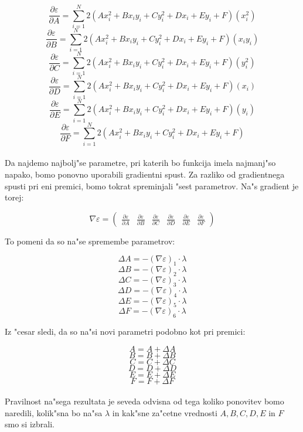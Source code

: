 \documentclass[a4paper, 12pt]{article}
\begin{document}
	$$\frac{\partial \varepsilon}{\partial A} = \sum_{i=1}^{N}2(Ax_i^2 + Bx_iy_i + Cy_i^2 + Dx_i + Ey_i + F)(x_i^2)$$
	$$\frac{\partial \varepsilon}{\partial B} = \sum_{i=1}^{N}2(Ax_i^2 + Bx_iy_i + Cy_i^2 + Dx_i + Ey_i + F)(x_iy_i)$$
	$$\frac{\partial \varepsilon}{\partial C} = \sum_{i=1}^{N}2(Ax_i^2 + Bx_iy_i + Cy_i^2 + Dx_i + Ey_i + F)(y_i^2)$$
	$$\frac{\partial \varepsilon}{\partial D} = \sum_{i=1}^{N}2(Ax_i^2 + Bx_iy_i + Cy_i^2 + Dx_i + Ey_i + F)(x_i)$$
	$$\frac{\partial \varepsilon}{\partial E} = \sum_{i=1}^{N}2(Ax_i^2 + Bx_iy_i + Cy_i^2 + Dx_i + Ey_i + F)(y_i)$$
	$$\frac{\partial \varepsilon}{\partial F} = \sum_{i=1}^{N}2(Ax_i^2 + Bx_iy_i + Cy_i^2 + Dx_i + Ey_i + F)$$

	\paragraph{}
	Da najdemo najbolj"se parametre, pri katerih bo funkcija imela najmanj"so napako, bomo ponovno uporabili gradientni spust. Za razliko od gradientnega spusti pri eni premici, bomo tokrat spreminjali "sest parametrov. Na"s gradient je torej:

	$$\nabla \varepsilon = \begin{pmatrix}
	\frac{\partial \varepsilon}{\partial A} &
	\frac{\partial \varepsilon}{\partial B} &
	\frac{\partial \varepsilon}{\partial C} &
	\frac{\partial \varepsilon}{\partial D} &
	\frac{\partial \varepsilon}{\partial E} &
	\frac{\partial \varepsilon}{\partial F}
	\end{pmatrix}$$

	To pomeni da so na"se spremembe parametrov:

	$$\Delta A = -(\nabla \varepsilon)_1 \cdot \lambda$$
	$$\Delta B = -(\nabla \varepsilon)_2 \cdot \lambda$$
	$$\Delta C = -(\nabla \varepsilon)_3 \cdot \lambda$$
	$$\Delta D = -(\nabla \varepsilon)_4 \cdot \lambda$$
	$$\Delta E = -(\nabla \varepsilon)_5 \cdot \lambda$$
	$$\Delta F = -(\nabla \varepsilon)_6 \cdot \lambda$$

	Iz "cesar sledi, da so na"si novi parametri podobno kot pri premici:

	$$A = A + \Delta A$$
	$$B = B + \Delta B$$
	$$C = C + \Delta C$$
	$$D = D + \Delta D$$
	$$E = E + \Delta E$$
	$$F = F + \Delta F$$

	\paragraph{}Pravilnost na"sega rezultata je seveda odvisna od tega koliko ponovitev bomo naredili, kolik"sna bo na"sa $\lambda$ in kak"sne za"cetne vrednosti $A, B, C, D, E$ in $F$ smo si izbrali.
\end{document}
